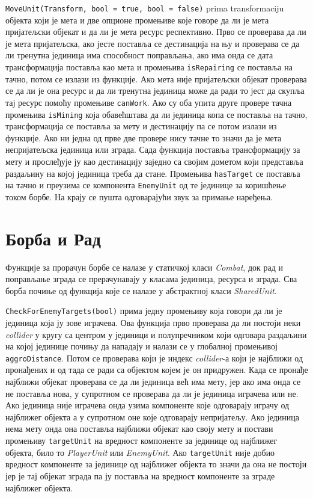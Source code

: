 \documentclass[11pt,a4paper]{article}
\begin{document}
\texttt{MoveUnit(Transform, bool = true, bool = false)} prima transformaciju објекта који је мета и две опционе промењиве које говоре да ли је мета пријатељски објекат и да ли је мета ресурс респективно. Прво се проверава да ли је мета пријатељска, ако јесте поставља се дестинација на њу и проверава се да ли тренутна јединица има способност поправљања, ако има онда се дата трансформација поставља као мета и промењива \texttt{isRepairing} се поставља на тачно, потом се излази из функције. Ако мета није пријатељски објекат проверава се да ли је она ресурс и да ли тренутна јединица може да ради то јест да скупља тај ресурс помоћу промењиве \texttt{canWork}. Ако су оба упита друге провере тачна промењива  \texttt{isMining} која обавећштава да ли јединица копа се поставља на тачно, трансформација се поставља за мету и дестинацију па се потом излази из функције. Ако ни  једна од прве две провере нису тачне то значи да је мета непријатељска јединица или зграда. Сада функција поставља трансформацију за мету и прослеђује ју као дестинацију заједно са својим дометом који представља раздаљину на којој јединица треба да стане. Промењива  \texttt{hasTarget} се поставља на тачно и преузима се компонента  \texttt{EnemyUnit} од те јединице за коришћење током борбе. На крају се пушта одговарајући звук за примање наређења.

\section{Борба и Рад}
Функције за прорачун борбе се налазе у статичкој класи \emph{Combat}, док рад и поправљање зграда се прерачунавају у класама јединица, ресурса и зграда. Сва борба почиње од функција које се налазе у абстрактној класи \emph{SharedUnit}.

\texttt{CheckForEnemyTargets(bool)} прима једну промењиву која говори да ли је јединица која ју зове играчева. Ова функција прво проверава да ли постоји неки \emph{collider} у кругу са центром у  јединици и полупречником који одговара раздаљини на којој јединице почињу да нападају и налази се у глобалној промењивој \texttt{aggroDistance}. Потом се проверава који је индекс \emph{collider}-а који је најближи од пронађених и од тада се ради са објектом којем је он придружен. Када се пронађе најближи објекат проверава се да ли јединица већ има мету, јер ако има онда се не поставља нова, у супротном се проверава да ли је јединица играчева или не. Ако јединица није играчева онда узима компоненте које одговарају играчу од најближег објекта а у супротном оне које одговарају непријатељу. Ако јединица нема мету онда она поставља најближи објекат као своју мету и постави промењиву \texttt{targetUnit} на вредност компоненте за јединице од најближег објекта, било то \emph{PlayerUnit} или \emph{EnemyUnit}. Ако \texttt{targetUnit} није добио вредност компоненте за јединице од најближег објекта то значи да она не постоји јер је тај објекат зграда па ју поставља на вредност компоненте за зграде најближег објекта.
\end{document}
